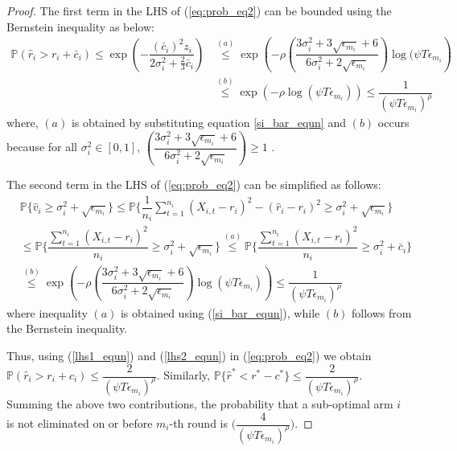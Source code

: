 \begin{proof}
%
The first term in the LHS of (\ref{eq:prob_eq2}) can be bounded using the Bernstein inequality as below:
\begin{align}
\mathbb{P}\left( \hat{r}_{i} > r_{i}+ \bar{c}_i\right)\nonumber 
\le \exp\left(- \dfrac{(\bar{c}_i)^2 z_{i}}{2\sigma_i^2 + \frac{2}{3}\bar{c}_i} \right)\nonumber 
& \overset{(a)}{\le} \exp\left(- \rho \left(\dfrac{3\sigma_{i}^{2}+3\sqrt{\epsilon_{m_{i}}} + 6}{6\sigma_i^2 + 2\sqrt{\epsilon_{m_i}}} \right)\log(\psi  T\epsilon_{m_{i}}\right)\nonumber \\
& \overset{(b)}{\leq} \exp\left(- \rho \log(\psi  T\epsilon_{m_{i}})\right) 
\le \dfrac{1}{(\psi  T\epsilon_{m_{i}})^{\rho}}
\label{lhs1_equn}
\end{align}
where, $(a)$ is obtained by substituting equation \ref{si_bar_equn} and $(b)$ occurs because for all $\sigma_{i}^2 \in [0,1]$, $\left(\dfrac{3\sigma_{i}^{2}+3\sqrt{\epsilon_{m_{i}}} + 6}{6\sigma_i^2 + 2\sqrt{\epsilon_{m_i}}}\right) \geq 1$ .

 
The second term in the LHS of (\ref{eq:prob_eq2}) can be simplified as follows:
\begin{align}
&\mathbb{P}\bigg\lbrace \hat{v}_{i}\geq \sigma_{i}^{2}+\sqrt{\epsilon_{m_{i}}}\bigg\rbrace\nonumber
\leq \mathbb{P}\bigg\lbrace \dfrac{1}{n_{i}}\sum_{t=1}^{n_{i}}(X_{i,t}-r_{i})^{2}-(\hat{r}_{i}-r_{i})^{2}\geq \sigma_{i}^{2}+\sqrt{\epsilon_{m_{i}}}\bigg\rbrace\nonumber\\
&\leq \mathbb{P}\bigg\lbrace \dfrac{\sum_{t=1}^{n_{i}}(X_{i,t}-r_{i})^{2}}{n_{i}}\geq \sigma_{i}^{2}+\sqrt{\epsilon_{m_{i}}} \bigg\rbrace\nonumber
\overset{(a)}{\leq} \mathbb{P}\bigg\lbrace \dfrac{\sum_{t=1}^{n_{i}}(X_{i,t}-r_{i})^{2}}{n_{i}}\geq \sigma_{i}^{2} + \bar{c}_i\bigg\rbrace \nonumber\\
&\overset{(b)}{\leq} \exp\left(- \rho \left(\dfrac{3\sigma_{i}^{2}+3\sqrt{\epsilon_{m_{i}}} + 6}{6\sigma_i^2 + 2\sqrt{\epsilon_{m_i}}} \right)\log(\psi  T\epsilon_{m_{i}})\right)
\le \dfrac{1}{(\psi  T\epsilon_{m_{i}})^{\rho}}
\label{lhs2_equn}
\end{align}
where inequality $(a)$ is obtained using (\ref{si_bar_equn}), while $(b)$ follows from the Bernstein inequality.
  
Thus, using (\ref{lhs1_equn}) and (\ref{lhs2_equn}) in (\ref{eq:prob_eq2}) we obtain $\mathbb{P}(\hat{r}_{i}> r_{i} + c_{i})\le \dfrac{2}{(\psi  T\epsilon_{m_{i}})^{\rho}}$. Similarly, $\mathbb{P}\lbrace\hat{r}^{*} < r^{*} - c^{*}\rbrace \leq \dfrac{2}{(\psi  T\epsilon_{m_{i}})^{\rho}}$. Summing the above two contributions, the probability that a sub-optimal arm ${i}$ is not eliminated on or before $m_{i}$-th round is  $\bigg(\dfrac{4}{(\psi T\epsilon_{m_{i}})^{\rho}} \bigg)$.


\end{proof}
